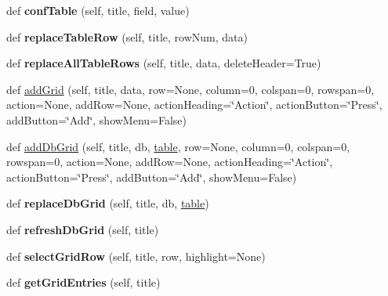 \begin{DoxyCompactItemize}
\mbox{\label{classappjar_1_1gui_ab4f14d369c4580ccda0c4e6511e6d9f3}} 
def {\bfseries conf\+Table} (self, title, field, value)
\item 
\mbox{\label{classappjar_1_1gui_a0a398e2c117fe9aac420b548c5c2c175}} 
def {\bfseries replace\+Table\+Row} (self, title, row\+Num, data)
\item 
\mbox{\label{classappjar_1_1gui_a75d8c49582aefb95d8eab0fc1022f383}} 
def {\bfseries replace\+All\+Table\+Rows} (self, title, data, delete\+Header=True)
\item 
def \hyperlink{classappjar_1_1gui_a0e25170d6d4d38fd911d2b67bd7a3177}{add\+Grid} (self, title, data, row=None, column=0, colspan=0, rowspan=0, action=None, add\+Row=None, action\+Heading=\char`\"{}Action\char`\"{}, action\+Button=\char`\"{}Press\char`\"{}, add\+Button=\char`\"{}Add\char`\"{}, show\+Menu=False)
\item 
def \hyperlink{classappjar_1_1gui_a8e7ec47ea9fe810569b2cd5bb94abdce}{add\+Db\+Grid} (self, title, db, \hyperlink{classappjar_1_1gui_a137fe094086a1e996bdbcb8bb56c20ae}{table}, row=None, column=0, colspan=0, rowspan=0, action=None, add\+Row=None, action\+Heading=\char`\"{}Action\char`\"{}, action\+Button=\char`\"{}Press\char`\"{}, add\+Button=\char`\"{}Add\char`\"{}, show\+Menu=False)
\item 
\mbox{\label{classappjar_1_1gui_a40f3d15c9b6cb20059ef3b8f5be66885}} 
def {\bfseries replace\+Db\+Grid} (self, title, db, \hyperlink{classappjar_1_1gui_a137fe094086a1e996bdbcb8bb56c20ae}{table})
\item 
\mbox{\label{classappjar_1_1gui_a6fe252d33cf3ae57550869d71558abc2}} 
def {\bfseries refresh\+Db\+Grid} (self, title)
\item 
\mbox{\label{classappjar_1_1gui_afc001a3cdf9afc0b35c15ca6466994a4}} 
def {\bfseries select\+Grid\+Row} (self, title, row, highlight=None)
\item 
\mbox{\label{classappjar_1_1gui_a6373c2dd2c8e80e355cd7b816c8d4d8d}} 
def {\bfseries get\+Grid\+Entries} (self, title)
\item 
\mbox{\label{classappjar_1_1gui_ab2d8c6318d77472ccd6bd868c5bc67f4}} 

\end{DoxyCompactItemize}
